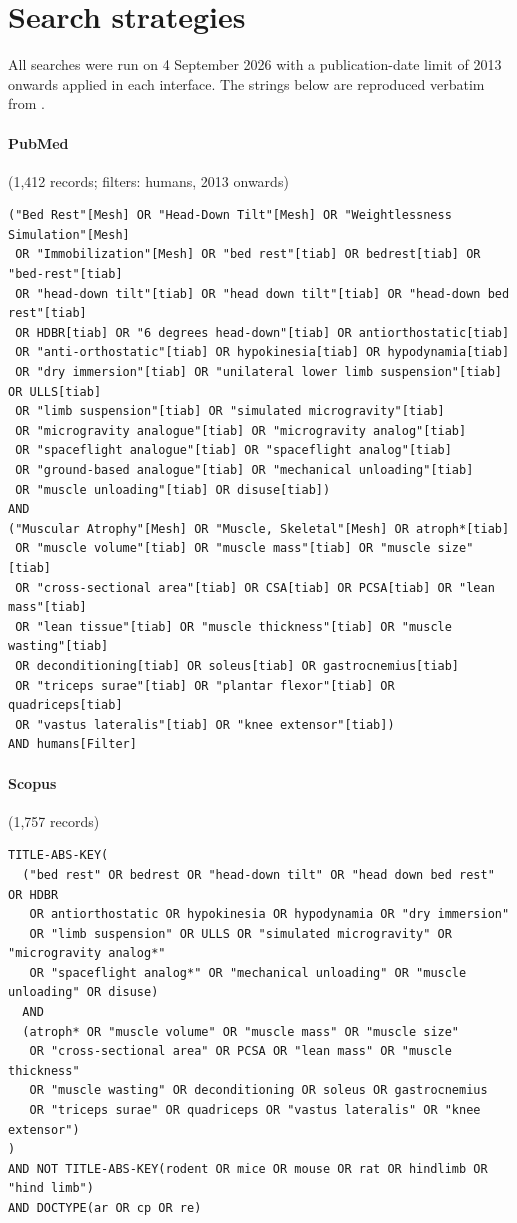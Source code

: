 \section{Search strategies}
\label{app:search}

All searches were run on 4 September 2026 with a publication-date limit of 2013 onwards applied in each interface.
The strings below are reproduced verbatim from .

\paragraph{PubMed} (1,412 records; filters: humans, 2013 onwards)
{\footnotesize
\begin{verbatim}
("Bed Rest"[Mesh] OR "Head-Down Tilt"[Mesh] OR "Weightlessness Simulation"[Mesh]
 OR "Immobilization"[Mesh] OR "bed rest"[tiab] OR bedrest[tiab] OR "bed-rest"[tiab]
 OR "head-down tilt"[tiab] OR "head down tilt"[tiab] OR "head-down bed rest"[tiab]
 OR HDBR[tiab] OR "6 degrees head-down"[tiab] OR antiorthostatic[tiab]
 OR "anti-orthostatic"[tiab] OR hypokinesia[tiab] OR hypodynamia[tiab]
 OR "dry immersion"[tiab] OR "unilateral lower limb suspension"[tiab] OR ULLS[tiab]
 OR "limb suspension"[tiab] OR "simulated microgravity"[tiab]
 OR "microgravity analogue"[tiab] OR "microgravity analog"[tiab]
 OR "spaceflight analogue"[tiab] OR "spaceflight analog"[tiab]
 OR "ground-based analogue"[tiab] OR "mechanical unloading"[tiab]
 OR "muscle unloading"[tiab] OR disuse[tiab])
AND
("Muscular Atrophy"[Mesh] OR "Muscle, Skeletal"[Mesh] OR atroph*[tiab]
 OR "muscle volume"[tiab] OR "muscle mass"[tiab] OR "muscle size"[tiab]
 OR "cross-sectional area"[tiab] OR CSA[tiab] OR PCSA[tiab] OR "lean mass"[tiab]
 OR "lean tissue"[tiab] OR "muscle thickness"[tiab] OR "muscle wasting"[tiab]
 OR deconditioning[tiab] OR soleus[tiab] OR gastrocnemius[tiab]
 OR "triceps surae"[tiab] OR "plantar flexor"[tiab] OR quadriceps[tiab]
 OR "vastus lateralis"[tiab] OR "knee extensor"[tiab])
AND humans[Filter]
\end{verbatim}
}

\paragraph{Scopus} (1,757 records)
{\footnotesize
\begin{verbatim}
TITLE-ABS-KEY(
  ("bed rest" OR bedrest OR "head-down tilt" OR "head down bed rest" OR HDBR
   OR antiorthostatic OR hypokinesia OR hypodynamia OR "dry immersion"
   OR "limb suspension" OR ULLS OR "simulated microgravity" OR "microgravity analog*"
   OR "spaceflight analog*" OR "mechanical unloading" OR "muscle unloading" OR disuse)
  AND
  (atroph* OR "muscle volume" OR "muscle mass" OR "muscle size"
   OR "cross-sectional area" OR PCSA OR "lean mass" OR "muscle thickness"
   OR "muscle wasting" OR deconditioning OR soleus OR gastrocnemius
   OR "triceps surae" OR quadriceps OR "vastus lateralis" OR "knee extensor")
)
AND NOT TITLE-ABS-KEY(rodent OR mice OR mouse OR rat OR hindlimb OR "hind limb")
AND DOCTYPE(ar OR cp OR re)
\end{verbatim}
}

